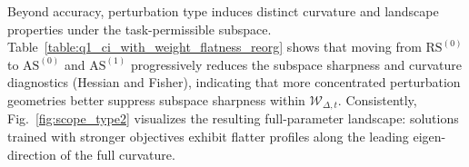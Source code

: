 \documentclass{article}
\theoremstyle{plain}
\theoremstyle{definition}
\theoremstyle{remark}
\begin{document}
Beyond accuracy, perturbation type induces distinct curvature and landscape properties under the task-permissible subspace.
Table~\ref{table:q1_ci_with_weight_flatness_reorg} shows that moving from $\mathrm{RS}^{(0)}$ to $\mathrm{AS}^{(0)}$ and $\mathrm{AS}^{(1)}$ progressively reduces the subspace sharpness and curvature diagnostics (Hessian and Fisher), indicating that more concentrated perturbation geometries better suppress subspace sharpness within $\mathcal W_{\Delta,t}$.
Consistently, Fig.~\ref{fig:scope_type2} visualizes the resulting {full-parameter} landscape: solutions trained with stronger objectives exhibit flatter profiles along the leading eigen-direction of the full curvature.

\end{document}
